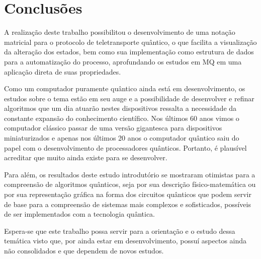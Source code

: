 
\chapter{Conclusões}

A realização deste trabalho possibilitou o desenvolvimento de uma notação matricial para o protocolo de teletransporte quântico, o que facilita a visualização da alteração dos estados, bem como sua implementação como estrutura de dados para a automatização do processo, aprofundando os estudos em MQ em uma aplicação direta de suas propriedades.

Como um computador puramente quântico ainda está em desenvolvimento, os estudos sobre o tema estão em seu auge e a possibilidade de desenvolver e refinar algoritmos que um dia atuarão nestes dispositivos ressalta a necessidade da constante expansão do conhecimento científico. Nos últimos 60 anos vimos o computador clássico passar de uma versão gigantesca para dispositivos miniaturizados e apenas nos últimos 20 anos o computador quântico saiu do papel com o desenvolvimento de processadores quânticos. Portanto, é plausível acreditar que muito ainda existe para se desenvolver.

Para além, os resultados deste estudo introdutório se mostraram otimistas para a compreensão de algoritmos quânticos, seja por sua descrição físico-matemática ou por sua representação gráfica na forma dos circuitos quânticos que podem servir de base para a compreensão de sistemas mais complexos e sofisticados, possíveis de ser implementados com a tecnologia quântica.

Espera-se que este trabalho possa servir para a orientação e o estudo dessa temática visto que, por ainda estar em desenvolvimento, possuí aspectos ainda não consolidados e que dependem de novos estudos.

